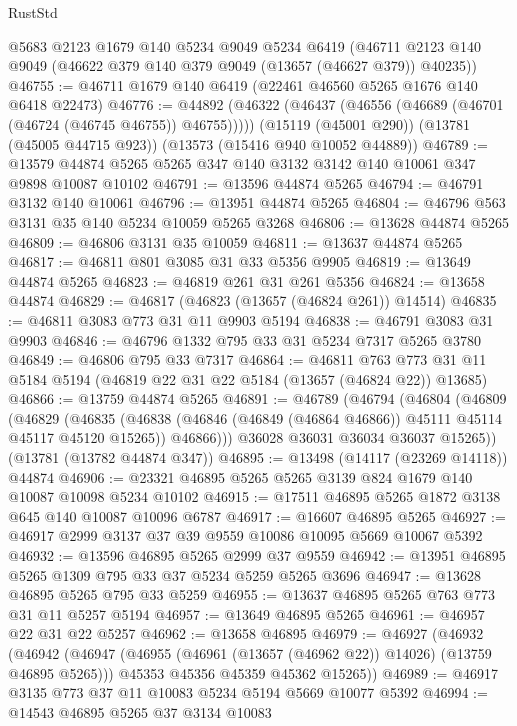\begin{lexlean}{RustStd}
\begin{coremodule}
    @5683
    @2123
    @1679
    @140
    @5234
    @9049
    @5234
    @6419
    (@46711 @2123 @140 @9049 (@46622 @379 @140 @379 @9049 (@13657 (@46627 @379)) @40235))
@46755 := @46711 @1679 @140 @6419 (@22461 @46560 @5265 @1676 @140 @6418 @22473)
@46776 := @44892
    (@46322 (@46437 (@46556 (@46689 (@46701 (@46724 (@46745 @46755)) @46755)))))
    (@15119 (@45001 @290))
    (@13781 (@45005 @44715 @923))
    (@13573 (@15416 @940 @10052 @44889))
@46789 := @13579 @44874 @5265 @5265 @347 @140 @3132 @3142 @140 @10061 @347 @9898 @10087 @10102
@46791 := @13596 @44874 @5265
@46794 := @46791 @3132 @140 @10061
@46796 := @13951 @44874 @5265
@46804 := @46796 @563 @3131 @35 @140 @5234 @10059 @5265 @3268
@46806 := @13628 @44874 @5265
@46809 := @46806 @3131 @35 @10059
@46811 := @13637 @44874 @5265
@46817 := @46811 @801 @3085 @31 @33 @5356 @9905
@46819 := @13649 @44874 @5265
@46823 := @46819 @261 @31 @261 @5356
@46824 := @13658 @44874
@46829 := @46817 (@46823 (@13657 (@46824 @261)) @14514)
@46835 := @46811 @3083 @773 @31 @11 @9903 @5194
@46838 := @46791 @3083 @31 @9903
@46846 := @46796 @1332 @795 @33 @31 @5234 @7317 @5265 @3780
@46849 := @46806 @795 @33 @7317
@46864 := @46811
    @763
    @773
    @31
    @11
    @5184
    @5194
    (@46819 @22 @31 @22 @5184 (@13657 (@46824 @22)) @13685)
@46866 := @13759 @44874 @5265
@46891 := @46789
    (@46794
      (@46804
        (@46809
          (@46829
            (@46835
              (@46838 (@46846 (@46849 (@46864 @46866)) @45111 @45114 @45117 @45120 @15265))
              @46866)))
        @36028
        @36031
        @36034
        @36037
        @15265))
    (@13781 (@13782 @44874 @347))
@46895 := @13498 (@14117 (@23269 @14118)) @44874
@46906 := @23321 @46895 @5265 @5265 @3139 @824 @1679 @140 @10087 @10098 @5234 @10102
@46915 := @17511 @46895 @5265 @1872 @3138 @645 @140 @10087 @10096 @6787
@46917 := @16607 @46895 @5265
@46927 := @46917 @2999 @3137 @37 @39 @9559 @10086 @10095 @5669 @10067 @5392
@46932 := @13596 @46895 @5265 @2999 @37 @9559
@46942 := @13951 @46895 @5265 @1309 @795 @33 @37 @5234 @5259 @5265 @3696
@46947 := @13628 @46895 @5265 @795 @33 @5259
@46955 := @13637 @46895 @5265 @763 @773 @31 @11 @5257 @5194
@46957 := @13649 @46895 @5265
@46961 := @46957 @22 @31 @22 @5257
@46962 := @13658 @46895
@46979 := @46927
    (@46932
      (@46942
        (@46947 (@46955 (@46961 (@13657 (@46962 @22)) @14026) (@13759 @46895 @5265)))
        @45353
        @45356
        @45359
        @45362
        @15265))
@46989 := @46917 @3135 @773 @37 @11 @10083 @5234 @5194 @5669 @10077 @5392
@46994 := @14543 @46895 @5265 @37 @3134 @10083

\end{coremodule}
\end{lexlean}
